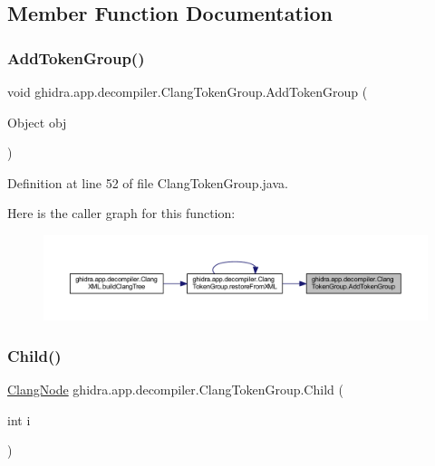\subsection{Member Function Documentation}
\mbox{\label{classghidra_1_1app_1_1decompiler_1_1_clang_token_group_ae3ba0e1e0c86d34a85a6a58c84ece169}} 
\subsubsection{\texorpdfstring{AddTokenGroup()}{AddTokenGroup()}}
{\footnotesize\ttfamily void ghidra.\+app.\+decompiler.\+Clang\+Token\+Group.\+Add\+Token\+Group (\begin{DoxyParamCaption}\item[{Object}]{obj }\end{DoxyParamCaption})\hspace{0.3cm}{\ttfamily [inline]}}



Definition at line 52 of file Clang\+Token\+Group.\+java.

Here is the caller graph for this function\+:
\nopagebreak
\begin{figure}[H]
\begin{center}
\leavevmode
\includegraphics[width=350pt]{classghidra_1_1app_1_1decompiler_1_1_clang_token_group_ae3ba0e1e0c86d34a85a6a58c84ece169_icgraph}
\end{center}
\end{figure}
\mbox{\label{classghidra_1_1app_1_1decompiler_1_1_clang_token_group_a46fb87fe558080bdc0dd85072e915e90}} 
\subsubsection{\texorpdfstring{Child()}{Child()}}
{\footnotesize\ttfamily \mbox{\hyperlink{interfaceghidra_1_1app_1_1decompiler_1_1_clang_node}{Clang\+Node}} ghidra.\+app.\+decompiler.\+Clang\+Token\+Group.\+Child (\begin{DoxyParamCaption}\item[{int}]{i }\end{DoxyParamCaption})\hspace{0.3cm}{\ttfamily [inline]}}



